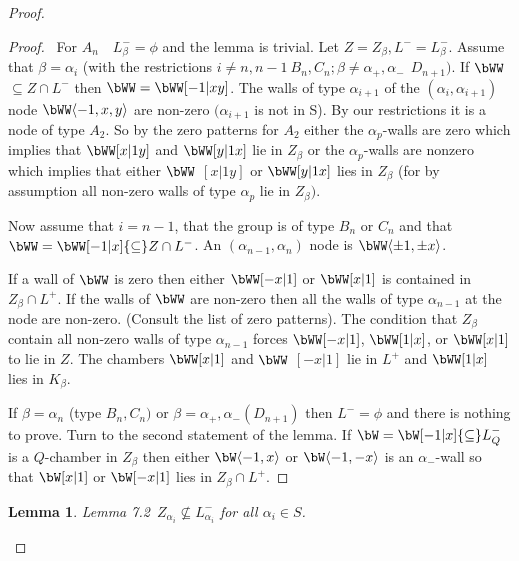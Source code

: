 \documentclass{memo-l}
\newtheorem{lemma}[theorem]{Lemma}
\theoremstyle{definition}
\theoremstyle{remark}
\numberwithin{section}{chapter}
\numberwithin{equation}{chapter}
\begin{document}
\begin{proof}
\begin{proof} \ For $A_{n} \quad L_{{\beta}}^{-} = {\phi}$ and the lemma is
trivial.  Let $Z=Z_{{\beta}}, L^{-} = L_{{\beta}}^{-}$.  Assume that
${\beta} = {\alpha}_{i}$ (with the restrictions $i\ne n,n-1 \  B_{n},C_{n};
{\beta}\ne {\alpha}_{+},{\alpha}_{-} \ \ D_{n+1})$.  If $\bWW$
${\subseteq}Z \cap L^{-}$ then $\bWW= \bWW[-1\vert xy]$.  The
walls of type ${\alpha}_{i+1}$ of the $({\alpha}_{i},{\alpha}_{i+1})$ node
$\bWW\langle -1,x,y\rangle$ are non-zero $({\alpha}_{i+1}$ is not in S).  By our
restrictions it is a node of type $A_{2}$.  So by the zero patterns for
$A_{2}$ either the ${\alpha}_{p}$-walls are zero which implies that 
$\bWW[x\vert 1y]$ and $\bWW[y\vert 1x]$ lie in $Z_{{\beta}}$ or the
${\alpha}_{p}$-walls are nonzero which implies that either $\bWW$
$[x\vert 1y]$ or $\bWW[y\vert 1x]$ lies in $Z_{{\beta}}$ 
(for by
assumption all non-zero walls of type ${\alpha}_{p}$ lie in $Z_{{\beta}})$.


   Now assume that $i = n-1$, that the group is of type $B_{n}$ or $C_{n}$
and that $\bWW= \bWW [-1\vert x]{\subseteq} Z \cap L^{-}$.  An
$({\alpha}_{n-1},{\alpha}_{n})$ node is $\bWW\langle
{\pm}1,{\pm}x\rangle $.

\medskip
\medskip

\noindent
If a wall of $\bWW$ is zero then either $\bWW[-x\vert 1]$ or 
$\bWW[x\vert 1]$ is contained in $Z_{{\beta}} \cap L^{+}$.  If the walls of
$\bWW$ are non-zero then all the walls of type ${\alpha}_{n-1}$ at the
node are non-zero.  (Consult the list of zero patterns).  The condition
that $Z_{{\beta}}$ contain all non-zero walls of type ${\alpha}_{n-1}$
forces $\bWW[-x\vert 1]$, $\bWW[1\vert x]$, or $\bWW[x\vert
1]$ to lie in $Z$.  The chambers $\bWW[x\vert 1]$ and $\bWW$
$[-x\vert 1]$ lie in $L^{+}$ and $\bWW[1\vert x]$ lies in
$K_{{\beta}}$.

   If ${\beta} = {\alpha}_{n}$ (type $B_{n}, C_{n})$ or ${\beta} =
{\alpha}_{+},{\alpha}_{-} (D_{n+1})$ then $L^{-} = {\phi}$ and there is
nothing to prove.  Turn to the second statement of the lemma.  If $\bW
 = \bW [-1\vert x] {\subseteq} L_{Q}^{-}$ is a $Q$-chamber in
$Z_{{\beta}}$ then either $\bW \langle -1,x\rangle$ or $\bW\langle -1,-x\rangle $ is an
${\alpha}_{-}$-wall so that $\bW [x\vert 1]$ or $\bW [-x\vert 1]$
lies in $Z_{{\beta}}\cap L^+$.
\end{proof} 

{\medskip}



\begin{lemma}{Lemma 7.2}\ $Z_{\alpha_i} {\not\subseteq} L_{{\alpha_i}}^{-}$ for
all ${\alpha}_{i}  \in  S$.
\end{lemma}


\end{proof}
\end{document}
